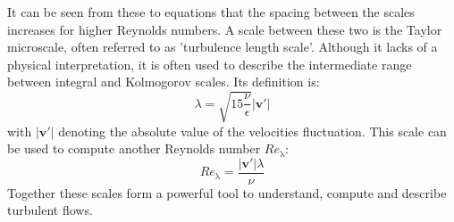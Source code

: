 \documentclass[11pt,a4paper,openany,oneside,parskip=half*]{article}
\renewcommand*\vec[1]{\boldsymbol{#1}}
\begin{document}
It can be seen from these to equations that the spacing between the scales increases for higher Reynolds numbers. 
\newline
A scale between these two is the Taylor microscale, often referred to as 'turbulence length scale'. 
Although it lacks of a physical interpretation, it is often used to describe the intermediate range between integral and Kolmogorov scales. 
Its definition is: 
\begin{equation}
\lambda = \sqrt{15 \frac{\nu}{\epsilon}} |\vec{v'}|
\end{equation}
with $|\vec{v'}|$ denoting the absolute value of the velocities fluctuation. This scale can be used to compute another Reynolds number $Re_\mathrm{\lambda}$:
\begin{equation}
Re_\mathrm{\lambda} = \frac{|\vec{v'}| \lambda}{\nu}
\end{equation}
Together these scales form a powerful tool to understand, compute and describe turbulent flows. 
\pagebreak
\end{document}
